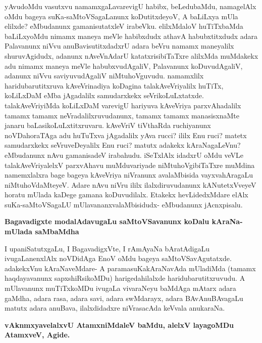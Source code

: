 yAvudoMdu vasutxvu namamxgaLavarevigU habibx, beLedubaMdu, namagelAlx oMdu bageya suKa-saMtoVSagaLanunx koDutitxdeyoV, A baLiLxya mUla elilxde? eMbudanunx gamanisutatxleV irabeVku. elilxMdaloV huTiTxbaMda baLiLxyoMdu nimamx maneya meVle habibxdudx athavA habubxtitxdudx adara Palavanunx niVvu anuBavisutitxdadxrU adara beVru namamx maneyalilx shuruvAgidudx, adanunx nAveVnAdarU katatxrisibiTaTxre alilxMda muMdakekx adu nimamx maneya meVle habubxvudAgaliV, Palavanunx koDuvudAgaliV, adanunx niVvu saviyuvudAgaliV niMtuhoVguvudu. namamxlilx haridubarutitxruva kAveVrinadiya koDagina talakAveVriyalilx huTiTx, koLiLxDaM eMba jAgadalilx samudarxkekx seVrikoLuLxtatxde. talakAveVriyiMda koLiLxDaM varevigU hariyuva kAveVriya parxvAhadalilx tamamx tamamx neVradalilxruvudanunx, tamamx tamamx manasisxnaMte janaru baLasikoLuLxtitxruvaru. kAveVriV tiVthaRda ruchiyanunx noVDahoraTAga adu huTuTxva jAgadalilx yAva rucci? ililx Enu ruci? matetx samudarxkekx seVruveDeyalilx Enu ruci? matutx adakekx kAraNagaLeVnu? eMbudanunx nAvu gamanisadeV irabahudu. iSeTxlAlx idadxrU oMdu veVLe talakAveVriyalelxV parxvAhavu muMduvariyade niMtuhoVgibiTaTxre muMdina namemxlalxra bage bageya kAveVriya niVranunx avalaMbisida vayxvahAragaLu niMtuhoVdaMteyeV. Adare nAvu niVru ililx ilalxdiruvudanunx kANutetxVveyeV horatu mUlada kaDege gamana koDuvudilalx. Etakekx hevLidedxMdare elAlx suKa-saMtoVSagaLU mUlavananxvalaMbisidudx- eMbudanunx jAcnxpisalu.

{\bf Bagavadigxte modalAdavugaLu saMtoVSavanunx koDalu kAraNa- mUlada saMbaMdha}

I upaniSatutxgaLu, I BagavadigxVte, I rAmAyaNa bAratAdigaLu ivugaLanenxlAlx noVDidAga EnoV oMdu bageya saMtoVSavAgutatxde. adakekxVnu kAraNaveMdare- A paramasuKakAraNavAda mUladiMda (tamamx haqdayavanunx sapxshiRsikoMDu) harigedahilalxde haridubarutitxruvudu. A mUlavanunx muTiTxkoMDu ivugaLa vivaraNeyu baMdAga mAtarx adara gaMdha, adara rasa, adara savi, adara swMdarayx, adara BAvAnuBAvagaLu matutx adara anuBava, ilalxdidadxre niVrasacAda keVvala anukaraNa.

{\bf vAknmxyavelalxvU AtamxniMdaleV baMdu, alelxV layagoMDu AtamxveV, Agide.}

